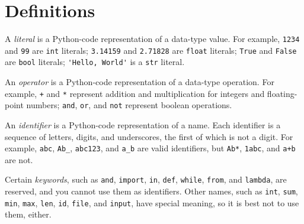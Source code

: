 \documentclass[8pt,a4paper,compress,handout]{beamer}
\begin{document}
\section{Definitions}
\begin{frame}[fragile]
A \emph{literal} is a Python-code representation of a data-type value. For example, \lstinline{1234} and \lstinline{99} are \lstinline{int} literals; \lstinline{3.14159} and \lstinline{2.71828} are \lstinline{float} literals; \lstinline{True} and \lstinline{False} are \lstinline{bool} literals; \lstinline{'Hello, World'} is a \lstinline{str} literal.

\bigskip

An \emph{operator} is a Python-code representation of a data-type operation. For example, \lstinline{+} and \lstinline{*} represent addition and multiplication for integers and floating-point numbers; \lstinline{and}, \lstinline{or}, and \lstinline{not} represent boolean operations.

\bigskip

An \emph{identifier} is a Python-code representation of a name. Each identifier is a sequence of letters, digits, and underscores, the first of which is not a digit. For example, \lstinline{abc}, \lstinline{Ab_}, \lstinline{abc123}, and \lstinline{a_b} are valid identifiers, but \lstinline{Ab*}, \lstinline{1abc}, and \lstinline{a+b} are not.

\bigskip

Certain \emph{keywords}, such as \lstinline{and}, \lstinline{import}, \lstinline{in}, \lstinline{def}, \lstinline{while}, \lstinline{from}, and \lstinline{lambda}, are reserved, and you cannot use them as identifiers. Other names, such as \lstinline{int}, \lstinline{sum}, \lstinline{min}, \lstinline{max}, \lstinline{len}, \lstinline{id}, \lstinline{file}, and \lstinline{input}, have special meaning, so it is best not to use them, either.
\end{frame}
\end{document}

